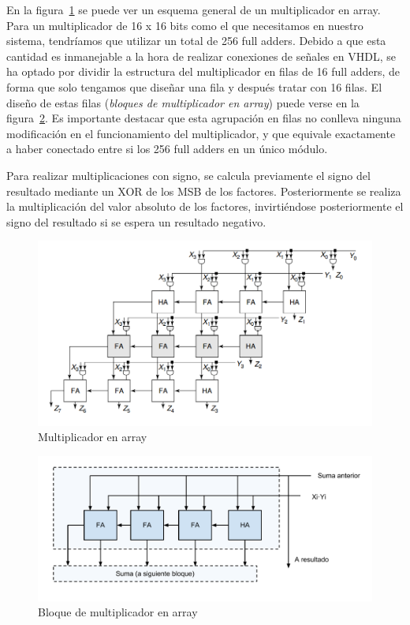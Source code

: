 \documentclass[a4paper,12pt]{article}
\begin{document}
En la figura~\ref{fig:array_multiplier} se puede ver un esquema general de un multiplicador en array. Para un multiplicador de 16 x 16 bits como el que necesitamos en nuestro sistema, tendríamos que utilizar un total de 256 full adders. Debido a que esta cantidad es inmanejable a la hora de realizar conexiones de señales en VHDL, se ha optado por dividir la estructura del multiplicador en filas de 16 full adders, de forma que solo tengamos que diseñar una fila y después tratar con 16 filas. El diseño de estas filas (\emph{bloques de multiplicador en array}) puede verse en la figura~\ref{fig:array_multiplier_block}. Es importante destacar que esta agrupación en filas no conlleva ninguna modificación en el funcionamiento del multiplicador, y que equivale exactamente a haber conectado entre si los 256 full adders en un único módulo.

Para realizar multiplicaciones con signo, se calcula previamente el signo del resultado mediante un XOR de los MSB de los factores. Posteriormente se realiza la multiplicación del valor absoluto de los factores, invirtiéndose posteriormente el signo del resultado si se espera un resultado negativo.

\begin{figure}[hbt]
\includegraphics[width=\textwidth]{img/array_multiplier.png} 
\caption{Multiplicador en array} \label{fig:array_multiplier}
\end{figure}

\begin{figure}[hbt]
\includegraphics[width=\textwidth]{img/array_mult_block.pdf} 
\caption{Bloque de multiplicador en array} \label{fig:array_multiplier_block}
\end{figure}
\end{document}
